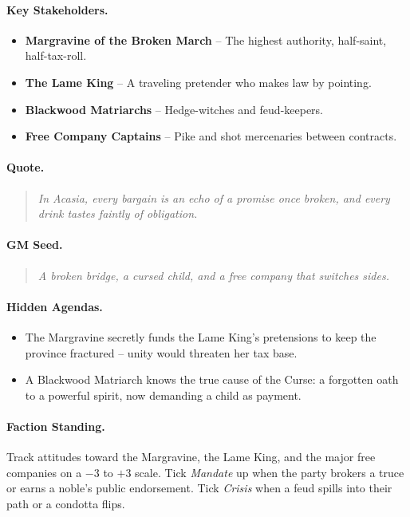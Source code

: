 \paragraph{Key Stakeholders.}
\begin{itemize}
  \item \textbf{Margravine of the Broken March} -- The highest authority, half-saint, half-tax-roll.
  \item \textbf{The Lame King} -- A traveling pretender who makes law by pointing.
  \item \textbf{Blackwood Matriarchs} -- Hedge-witches and feud-keepers.
  \item \textbf{Free Company Captains} -- Pike and shot mercenaries between contracts.
\end{itemize}

\paragraph{Quote.}
\begin{quote}
\emph{\textquotedbl In Acasia, every bargain is an echo of a promise once broken, and every drink tastes faintly of obligation.\textquotedbl}
\end{quote}

\paragraph{GM Seed.}
\begin{quote}
\emph{A broken bridge, a cursed child, and a free company that switches sides.}
\end{quote}

\paragraph{Hidden Agendas.}
\begin{itemize}
  \item The Margravine secretly funds the Lame King's pretensions to keep the province fractured -- unity would threaten her tax base.
  \item A Blackwood Matriarch knows the true cause of the Curse: a forgotten oath to a powerful spirit, now demanding a child as payment.
\end{itemize}

\paragraph{Faction Standing.}
Track attitudes toward the Margravine, the Lame King, and the major free companies on a \(-3\) to \(+3\) scale. Tick \textit{Mandate} up when the party brokers a truce or earns a noble's public endorsement. Tick \textit{Crisis} when a feud spills into their path or a condotta flips.

